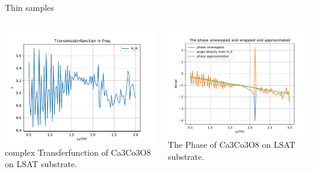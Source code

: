 \documentclass[aspectratio=1610, 9pt]{beamer}
\begin{document}
\begin{frame}{Thin samples}
  \begin{columns}
    \begin{column}{0.5\textwidth}
      \includegraphics[width=\textwidth]{images/2donSub/Transmissionfunction.pdf}
      {complex Transferfunction of Ca3Co3O8 on LSAT substrate.}
    \end{column} 
    \begin{column}{0.5\textwidth}
      \includegraphics[width=\textwidth]{images/2donSub/THzPhase_approximation.pdf}
      {The Phase of Ca3Co3O8 on LSAT substrate.}
    \end{column}
  \end{columns}
\end{frame}
\end{document}
